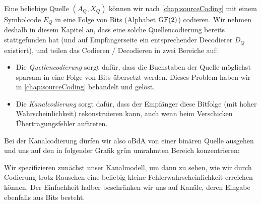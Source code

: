 Eine beliebige Quelle $(A_Q, X_Q)$ können wir nach \cref{chap:sourceCoding} mit einem Symbolcode $E_Q$ in eine Folge von Bits (Alphabet $\operatorname{GF}(2)$) codieren. Wir nehmen deshalb in diesem Kapitel an, dass eine solche Quellencodierung bereits stattgefunden hat (und auf Empfängerseite ein entsprechender Decodierer $D_Q$ existiert), und teilen das Codieren / Decodieren in zwei Bereiche auf:
\begin{itemize}
  \item Die \emph{Quellencodierung} sorgt dafür, dass die Buchstaben der Quelle möglichst sparsam in eine Folge von Bits übersetzt werden. Dieses Problem haben wir in \cref{chap:sourceCoding} behandelt und gelöst.
  \item Die \emph{Kanalcodierung} sorgt dafür, dass der Empfänger diese Bitfolge (mit hoher Wahrscheinlichkeit) rekonstruieren kann, auch wenn beim Verschicken Übertragungsfehler auftreten.
\end{itemize}
Bei der Kanalcodierung dürfen wir also oBdA von einer binären Quelle ausgehen und uns auf den in folgender Grafik grün umrahmten Bereich konzentrieren:
\begin{Center}
\end{Center}

Wir spezifizieren zunächst unser Kanalmodell, um dann zu sehen, wie wir durch Codierung trotz Rauschen eine beliebig kleine Fehlerwahrscheinlichkeit erreichen können. Der Einfachheit halber beschränken wir uns auf Kanäle, deren Eingabe ebenfalls aus Bits besteht.

